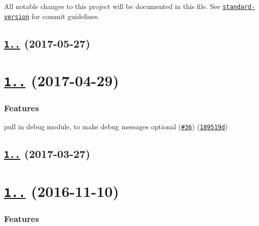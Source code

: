 All notable changes to this project will be documented in this file. See \href{https://github.com/conventional-changelog/standard-version}{\tt standard-\/version} for commit guidelines.

\label{_1.2.1}%
 \subsection*{\href{https://github.com/istanbuljs/istanbuljs/compare/istanbul-lib-source-maps@1.2.0...istanbul-lib-source-maps@1.2.1}{\tt 1..} (2017-\/05-\/27)}

\label{_1.2.0}%
 \section*{\href{https://github.com/istanbuljs/istanbul-lib-source-maps/compare/istanbul-lib-source-maps@1.1.1...istanbul-lib-source-maps@1.2.0}{\tt 1..} (2017-\/04-\/29)}

\subsubsection*{Features}


\begin{DoxyItemize}
\item pull in debug module, to make debug messages optional (\href{https://github.com/istanbuljs/istanbuljs/issues/36}{\tt \#36}) (\href{https://github.com/istanbuljs/istanbul-lib-source-maps/commit/189519d}{\tt 189519d})
\end{DoxyItemize}

\label{_1.1.1}%
 \subsection*{\href{https://github.com/istanbuljs/istanbul-lib-source-maps/compare/istanbul-lib-source-maps@1.1.0...istanbul-lib-source-maps@1.1.1}{\tt 1..} (2017-\/03-\/27)}

\label{_1.1.0}%
 \section*{\href{https://github.com/istanbuljs/istanbul-lib-source-maps/compare/v1.0.2...v1.1.0}{\tt 1..} (2016-\/11-\/10)}

\subsubsection*{Features}


